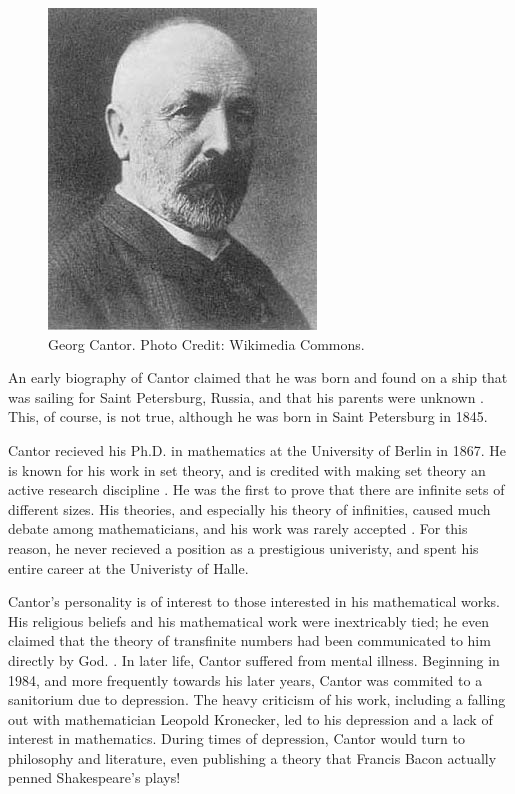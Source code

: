 \documentclass[../../../include/open-logic-section]{subfiles}
\begin{document}


\begin{figure}[h!] 
\centering 
\includegraphics[scale=.75]{georg-cantor.png}
\caption{Georg Cantor. Photo Credit: Wikimedia Commons.} 
\end{figure}

An early biography of Cantor claimed that he was born and found on a
ship that was sailing for Saint Petersburg, Russia, and that his parents
were unknown \citep[352]{Grattan-Guinness1971}. This, of course, is not
true, although he was born in Saint Petersburg in 1845.

Cantor recieved his Ph.D. in mathematics at the University of Berlin in
1867. He is known for his work in set theory, and is credited with making
set theory an active research discipline \citep[353]{Grattan-Guinness1971}.
He was the first to prove that there are infinite sets of different sizes.
His theories, and especially his theory of infinities, caused much debate
among mathematicians, and his work was rarely accepted
\citep[353]{Grattan-Guinness1971}. For this reason, he never recieved a
position as a prestigious univeristy, and spent his entire career at the
Univeristy of Halle.

Cantor's personality is of interest to those interested in his mathematical
works. His religious beliefs and his mathematical work were inextricably
tied; he even claimed that the theory of transfinite numbers had been
communicated to him directly by God. \citep[8]{Dauben2004}. In later life,
Cantor suffered from mental illness. Beginning in 1984, and more frequently
towards his later years, Cantor was commited to a sanitorium due to
depression. The heavy criticism of his work, including a falling out with
mathematician Leopold Kronecker, led to his depression and a lack of
interest in mathematics. During times of depression, Cantor would turn to
philosophy and literature, even publishing a theory that Francis Bacon
actually penned Shakespeare's plays!
\end{document}
